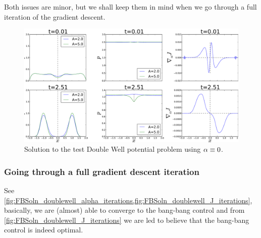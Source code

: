 Both issues are minor, but we shall keep them in mind when we go through a full
iteration of the gradient descent. 
\begin{figure}[htp] 
\begin{center}  
  \includegraphics[width=.9\textwidth]{Figs/DoublewellFBSolver/FB_alpha_null_solution_2.pdf}
  \caption[labelInTOC]{Solution to the test Double Well potential problem using
  $\alpha \equiv 0$. }
  \label{fig:FBSoln_doublewell_alpha_null}
\end{center}
\end{figure} 

\subsubsection{Going through a full gradient descent iteration}
See
\cref{fig:FBSoln_doublewell_alpha_iterations,fig:FBSoln_doublewell_J_iterations},
basically, we are (almost) able to converge to the bang-bang control and from
\cref{fig:FBSoln_doublewell_J_iterations} we are led to believe that the
bang-bang control is indeed optimal. 

